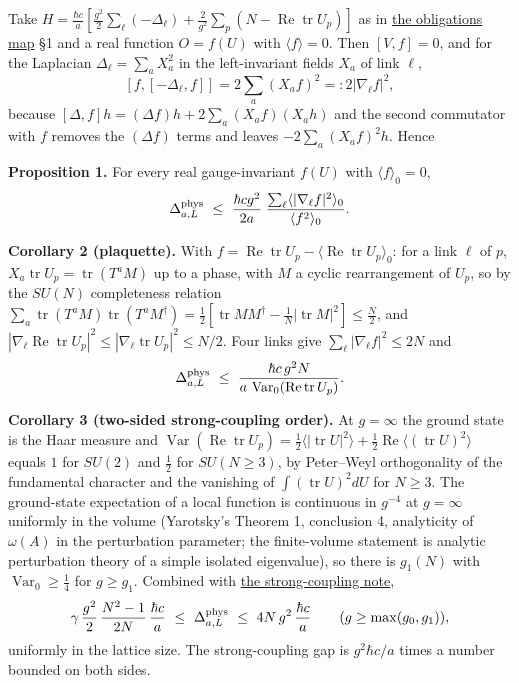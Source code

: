 \documentclass[11pt,a4paper]{article}
\begin{document}
Take
\(H=\frac{\hbar c}{a}[\frac{g^2}{2}\sum_\ell(-\Delta_\ell)+\frac2{g^2}\sum_p(N-\operatorname{Re}\operatorname{tr}U_p)]\)
as in \href{mass-gap-obligations-lattice.md}{the obligations map} §1 and
a real function \(O=f(U)\) with \(\langle f\rangle=0\). Then
\([V,f]=0\), and for the Laplacian \(\Delta_\ell=\sum_aX_a^2\) in the
left-invariant fields \(X_a\) of link \(\ell\),
\[[f,[-\Delta_\ell,f]]=2\sum_a(X_af)^2=:2|\nabla_\ell f|^2,\] because
\([\Delta,f]h=(\Delta f)h+2\sum_a(X_af)(X_ah)\) and the second
commutator with \(f\) removes the \((\Delta f)\) terms and leaves
\(-2\sum_a(X_af)^2h\). Hence

\textbf{Proposition 1.} For every real gauge-invariant \(f(U)\) with
\(\langle f\rangle_0=0\),
\[\Delta^{\rm phys}_{a,L}\ \le\ \frac{\hbar cg^2}{2a}\;
\frac{\sum_\ell\langle|\nabla_\ell f|^2\rangle_0}{\langle f^2\rangle_0}.\]

\textbf{Corollary 2 (plaquette).} With
\(f=\operatorname{Re}\operatorname{tr}U_p-\langle\operatorname{Re}\operatorname{tr}U_p\rangle_0\):
for a link \(\ell\) of \(p\),
\(X_a\operatorname{tr}U_p=\operatorname{tr}(T^aM)\) up to a phase, with
\(M\) a cyclic rearrangement of \(U_p\), so by the \(SU(N)\)
completeness relation
\(\sum_a\operatorname{tr}(T^aM)\operatorname{tr}(T^aM^\dagger)=\tfrac12[\operatorname{tr}MM^\dagger-\tfrac1N|\operatorname{tr}M|^2]\le\tfrac N2\),
and
\(|\nabla_\ell\operatorname{Re}\operatorname{tr}U_p|^2\le|\nabla_\ell\operatorname{tr}U_p|^2\le N/2\).
Four links give \(\sum_\ell|\nabla_\ell f|^2\le2N\) and
\[\Delta^{\rm phys}_{a,L}\ \le\ \frac{\hbar c\,g^2N}{a\,\operatorname{Var}_0(\operatorname{Re}\operatorname{tr}U_p)} .\]

\textbf{Corollary 3 (two-sided strong-coupling order).} At \(g=\infty\)
the ground state is the Haar measure and
\(\operatorname{Var}(\operatorname{Re}\operatorname{tr}U_p)=\tfrac12\langle|\operatorname{tr}U|^2\rangle+\tfrac12\operatorname{Re}\langle(\operatorname{tr}U)^2\rangle\)
equals \(1\) for \(SU(2)\) and \(\tfrac12\) for \(SU(N\ge3)\), by
Peter--Weyl orthogonality of the fundamental character and the vanishing
of \(\int(\operatorname{tr}U)^2dU\) for \(N\ge3\). The ground-state
expectation of a local function is continuous in \(g^{-4}\) at
\(g=\infty\) uniformly in the volume (Yarotsky's Theorem 1, conclusion
4, analyticity of \(\omega(A)\) in the perturbation parameter; the
finite-volume statement is analytic perturbation theory of a simple
isolated eigenvalue), so there is \(g_1(N)\) with
\(\operatorname{Var}_0\ge\tfrac14\) for \(g\ge g_1\). Combined with
\href{strong-coupling-uniform-gap.md}{the strong-coupling note},
\[\gamma\,\frac{g^2}{2}\,\frac{N^2-1}{2N}\,\frac{\hbar c}{a}\ \le\ \Delta^{\rm phys}_{a,L}\ \le\ 4N\,g^2\,\frac{\hbar c}{a}
\qquad(g\ge\max(g_0,g_1)),\] uniformly in the lattice size. The
strong-coupling gap is \(g^2\hbar c/a\) times a number bounded on both
sides.
\end{document}
